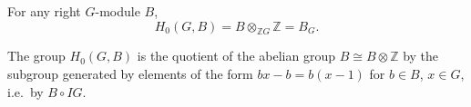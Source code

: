For any right $G$-module $B$,
$$H_0(G, B) = B \otimes_{\mathbb{Z}G} \mathbb{Z} = B_G.$$

The group $H_0(G, B)$ is the quotient of the abelian group $B \cong B \otimes \mathbb{Z}$ by the subgroup generated by elements of the form $bx - b = b(x-1)$ for $b \in B$, $x \in G$, i.e.\ by $B \circ IG$.
